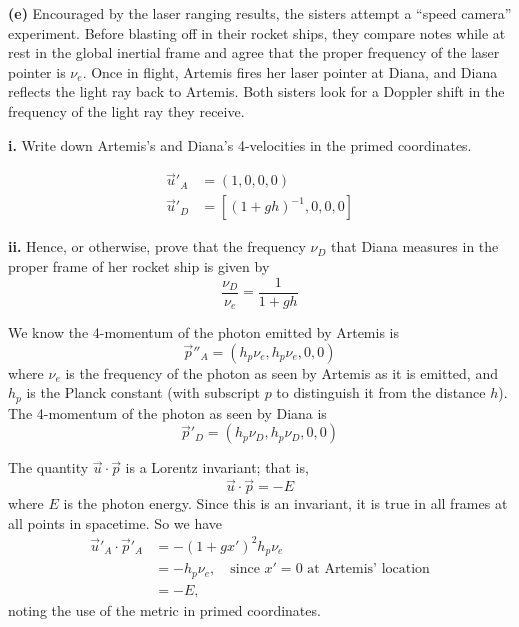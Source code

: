 \documentclass[a4paper]{article} %
\begin{document}
\begin{framed}
\textbf{(e)} Encouraged by the laser ranging results, the sisters attempt a ``speed camera'' experiment. Before blasting off in their rocket ships, they compare notes while at rest in the global inertial frame and agree that the proper frequency of the laser pointer is $\nu_e$. Once in flight, Artemis fires her laser pointer at Diana, and Diana reflects the light ray back to Artemis. Both sisters look for a Doppler shift in the frequency of the light ray they receive.
\end{framed}

\begin{framed}
\textbf{i.} Write down Artemis's and Diana's 4-velocities in the primed coordinates.
\end{framed}

\begin{align}
\vec{u}'_A&=(1,0,0,0)\\
\vec{u}'_D&=\left[(1+gh)^{-1},0,0,0\right]
\end{align}

\begin{framed}
\textbf{ii.} Hence, or otherwise, prove that the frequency $\nu_D$ that Diana measures in the proper frame of her rocket ship is given by
\begin{equation}
\frac{\nu_D}{\nu_e}=\frac{1}{1+gh}\label{eii. eq1}
\end{equation}
\end{framed}

We know the 4-momentum of the photon emitted by Artemis is
\begin{equation}
\vec{p}''_{A}=(h_p\nu_e,h_p\nu_e,0,0)
\end{equation}
where $\nu_e$ is the frequency of the photon as seen by Artemis as it is emitted, and $h_p$ is the Planck constant (with subscript $p$ to distinguish it from the distance $h$). The 4-momentum of the photon as seen by Diana is
\begin{equation}
\vec{p}'_{D}=(h_p\nu_D,h_p\nu_D,0,0)
\end{equation}

The quantity $\vec{u}\cdot\vec{p}$ is a Lorentz invariant; that is,
\begin{equation}
\vec{u}\cdot \vec{p}=-E
\end{equation}
where $E$ is the photon energy. Since this is an invariant, it is true in all frames at all points in spacetime. So we have
\begin{align}
\vec{u}'_A \cdot \vec{p}'_A&=-(1+gx')^2 h_p\nu_e\\
&=-h_p\nu_e, \quad\text{since $x'=0$ at Artemis' location}\\
&=-E,
\end{align}
noting the use of the metric in primed coordinates.
\end{document}
